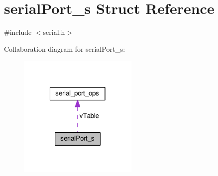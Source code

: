 \hypertarget{structserialPort__s}{\section{serial\+Port\+\_\+s Struct Reference}
\label{structserialPort__s}
}


{\ttfamily \#include $<$serial.\+h$>$}



Collaboration diagram for serial\+Port\+\_\+s\+:\nopagebreak
\begin{figure}[H]
\begin{center}
\leavevmode
\includegraphics[width=162pt]{structserialPort__s__coll__graph}
\end{center}
\end{figure}
